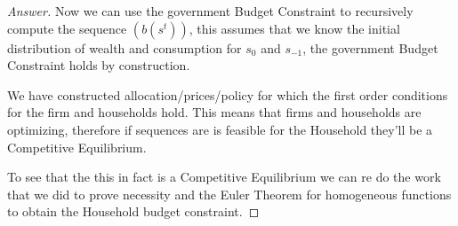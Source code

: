 \documentclass[12pt]{article}
\theoremstyle{definition}
\begin{document}
\begin{proof}[Answer]
Now we can use the government Budget Constraint to recursively compute the sequence $\left(b(s^t)\right)$, this assumes that we know the initial distribution of wealth and consumption for $s_0$ and $s_{-1}$, the government Budget Constraint holds by construction.

We have constructed allocation/prices/policy for which the first order conditions for the firm and households hold. This means that firms and households are optimizing, therefore if sequences are is feasible for the Household they'll be a Competitive Equilibrium. 

To see that the this in fact is a Competitive Equilibrium we can re do the work that we did to prove necessity and the Euler Theorem for homogeneous functions to obtain the Household budget constraint.

\end{proof}
\end{document}
